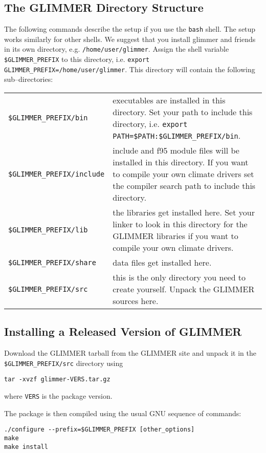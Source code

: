 \subsection{The GLIMMER Directory Structure}
The following commands describe the setup if you use the \texttt{bash} shell. The setup works similarly for other shells. We suggest that you install glimmer and friends in its own directory, e.g. \texttt{/home/user/glimmer}. Assign the shell variable \texttt{\$GLIMMER\_PREFIX} to this directory, i.e. \texttt{export GLIMMER\_PREFIX=/home/user/glimmer}. This directory will contain the following sub--directories:
\begin{center}
 \begin{tabular}{lp{9.5cm}}
   \texttt{\$GLIMMER\_PREFIX/bin} & executables are installed in this directory. Set your path to include this directory, i.e. \texttt{export PATH=\$PATH:\$GLIMMER\_PREFIX/bin}.  \\
   \texttt{\$GLIMMER\_PREFIX/include} & include and f95 module files will be installed in this directory. If you want to compile your own climate drivers set the compiler search path to include this directory. \\
   \texttt{\$GLIMMER\_PREFIX/lib} & the libraries get installed here. Set your linker to look in this directory for the GLIMMER libraries if you want to compile your own climate drivers. \\
   \texttt{\$GLIMMER\_PREFIX/share} & data files get installed here. \\
   \texttt{\$GLIMMER\_PREFIX/src} & this is the only directory you need to create yourself. Unpack the GLIMMER sources here.
 \end{tabular}
\end{center}

\subsection{Installing a Released Version of GLIMMER}\label{ug.sec.tarball}
Download the GLIMMER tarball from the GLIMMER site and unpack it in the \texttt{\$GLIMMER\_PREFIX/src} directory using
\begin{verbatim}
tar -xvzf glimmer-VERS.tar.gz
\end{verbatim}
where \texttt{VERS} is the package version.

The package is then compiled using the usual GNU sequence of commands:
\begin{verbatim}
./configure --prefix=$GLIMMER_PREFIX [other_options]
make
make install
\end{verbatim}

